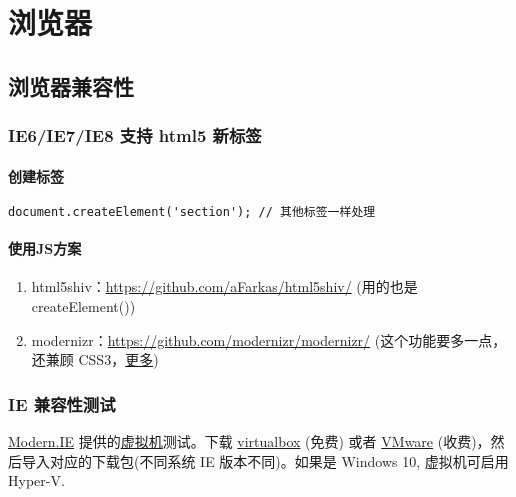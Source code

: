 \section{浏览器}\label{ux6d4fux89c8ux5668}

\subsection{浏览器兼容性}\label{ux6d4fux89c8ux5668ux517cux5bb9ux6027}

\subsubsection{IE6/IE7/IE8 支持 html5
新标签}\label{ie6ie7ie8-ux652fux6301-html5-ux65b0ux6807ux7b7e}

\paragraph{创建标签}\label{ux521bux5efaux6807ux7b7e}

\begin{lstlisting}[language=HTML]
document.createElement('section'); // 其他标签一样处理
\end{lstlisting}

\paragraph{使用JS方案}\label{ux4f7fux7528jsux65b9ux6848}

\begin{enumerate}
\def\labelenumi{\arabic{enumi}.}
\tightlist
\item
  html5shiv：\url{https://github.com/aFarkas/html5shiv/} (用的也是
  createElement())
\item
  modernizr：\url{https://github.com/modernizr/modernizr/}
  (这个功能要多一点，还兼顾
  CSS3，\href{http://www.osmn00.com/translation/221.html}{更多})
\end{enumerate}

\subsubsection{IE 兼容性测试}\label{ie-ux517cux5bb9ux6027ux6d4bux8bd5}

\href{https://dev.modern.ie/}{Modern.IE}
提供的\href{https://dev.modern.ie/tools/vms/windows/}{虚拟机}测试。下载
\href{https://www.virtualbox.org/}{virtualbox} (免费) 或者
\href{http://www.vmware.com/}{VMware}
(收费)，然后导入对应的下载包(不同系统 IE 版本不同)。如果是 Windows 10,
虚拟机可启用 Hyper-V.

